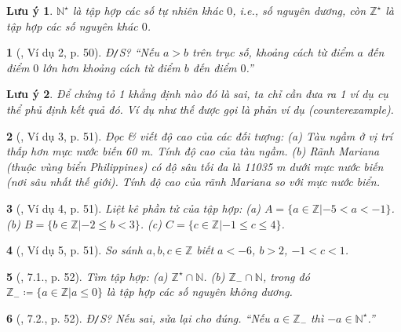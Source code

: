 \documentclass{article}
\newtheorem{baitoan}{}
\newtheorem{luuy}{Lưu ý}
\begin{document}
\begin{luuy}
	$\mathbb{N}^\star$ là tập hợp các số tự nhiên khác $0$, i.e., số nguyên dương, còn $\mathbb{Z}^\star$ là tập hợp các số nguyên khác $0$.
\end{luuy}

\begin{baitoan}[\cite{Binh_boi_duong_Toan_6_tap_1}, Ví dụ 2, p. 50]
	{\rm Đ{\tt/}S?} ``Nếu $a > b$ trên trục số, khoảng cách từ điểm $a$ đến điểm $0$ lớn hơn khoảng cách từ điểm $b$ đến điểm $0$.''
\end{baitoan}

\begin{luuy}
	Để chứng tỏ 1 khẳng định nào đó là sai, ta chỉ cần đưa ra 1 ví dụ cụ thể phủ định kết quả đó. Ví dụ như thế được gọi là {\rm phản ví dụ (counterexample)}.
\end{luuy}

\begin{baitoan}[\cite{Binh_boi_duong_Toan_6_tap_1}, Ví dụ 3, p. 51]
	Đọc \& viết độ cao của các đối tượng: (a) Tàu ngầm ở vị trí thấp hơn mực nước biến {\rm60 m}. Tính độ cao của tàu ngầm. (b) Rãnh Mariana (thuộc vùng biển Philippines) có độ sâu tối đa là {\rm11035 m} dưới mực nước biến (nơi sâu nhất thế giới). Tính độ cao của rãnh Mariana so với mực nước biển.
\end{baitoan}

\begin{baitoan}[\cite{Binh_boi_duong_Toan_6_tap_1}, Ví dụ 4, p. 51]
	Liệt kê phần tử của tập hợp: (a) $A = \{a\in\mathbb{Z}|-5 < a < -1\}$. (b) $B = \{b\in\mathbb{Z}|-2\le b < 3\}$. (c) $C = \{c\in\mathbb{Z}|-1\le c\le4\}$.
\end{baitoan}

\begin{baitoan}[\cite{Binh_boi_duong_Toan_6_tap_1}, Ví dụ 5, p. 51]
	So sánh $a,b,c\in\mathbb{Z}$ biết $a < -6$, $b > 2$, $-1 < c < 1$.
\end{baitoan}

\begin{baitoan}[\cite{Binh_boi_duong_Toan_6_tap_1}, 7.1., p. 52]
	Tìm tập hợp: (a) $\mathbb{Z}^\star\cap\mathbb{N}$. (b) $\mathbb{Z}_-\cap\mathbb{N}$, trong đó $\mathbb{Z}_-\coloneqq\{a\in\mathbb{Z}|a\le0\}$ là tập hợp các số nguyên không dương.
\end{baitoan}

\begin{baitoan}[\cite{Binh_boi_duong_Toan_6_tap_1}, 7.2., p. 52]
	{\rm Đ{\tt/}S?} Nếu sai, sửa lại cho đúng. ``Nếu $a\in\mathbb{Z}_-$ thì $-a\in\mathbb{N}^\star$.''
\end{baitoan}
\end{document}
